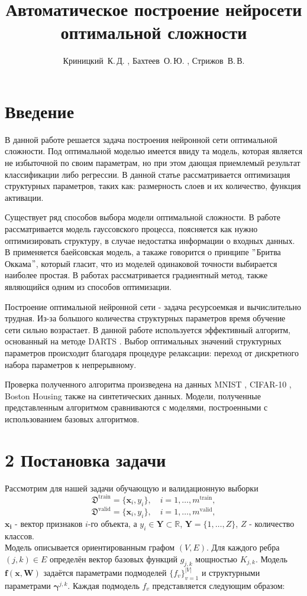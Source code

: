 \documentclass[12pt, twoside]{article}
\title
    {Автоматическое построение нейросети оптимальной сложности }
\author
    {Криницкий~К.\,Д. , Бахтеев~О.\,Ю. , Стрижов~В.\,В.}
\begin{document}
\maketitle

\section{Введение}
  В данной работе решается задача построения нейронной сети оптимальной сложности. Под оптимальной моделью имеется ввиду та модель, которая является не избыточной по своим параметрам, но при этом дающая приемлемый результат классификации либо регрессии. В данной статье рассматривается оптимизация структурных параметров, таких как: размерность слоев и их количество, функция активации.
  \par Существует ряд способов выбора модели оптимальной сложности. В работе \cite{GaussianModel} рассматривается модель гауссовского процесса, поясняется как нужно оптимизировать структуру, в случае недостатка информации о входных данных. В \cite{BayesianModel} применяется баейсовская модель, а такаже говорится о принципе $"$Бритва Оккама$"$, который гласит, что из моделей одинаковой точности выбирается наиболее простая. В работах \cite{Gradient1,Gradient2,Gradient3,Gradient4} рассматривается градиентный метод, также являющийся одним из способов оптимизации. 
  \par Построение оптимальной нейронной сети - задача ресурсоемкая и вычислительно трудная. Из-за большого количества структурных параметров время обучение сети сильно возрастает. В данной работе используется эффективный алгоритм, основанный на методе DARTS \cite{DARTS}. Выбор оптимальных значений структурных параметров происходит благодаря процедуре релаксации: переход от дискретного набора параметров к непрерывному.
  \par Проверка полученного алгоритма произведена на данных MNIST \cite{MNIST}, CIFAR-10 \cite{CIFAR}, Boston Housing \cite{Boston} также на синтетических данных. Модели, полученные представленным алгоритмом сравниваются с моделями, построенными с использованием базовых алгоритмов.



\section{2 Постановка задачи}
Рассмотрим для нашей задачи обучающую и валидационную выборки
$$
\mathfrak{D}^{\text{train}} = \{\mathbf{x}_i, y_i\}, \quad i=1,\dots,m^{\text{train}},
$$
$$
\mathfrak{D}^{\text{valid}} = \{\mathbf{x}_i, y_i\}, \quad i=1,\dots,m^{\text{valid}},
$$
$\mathbf{x_i}$ - вектор признаков $i$-го объекта, а $y_i\in\mathbf{Y}\subset\mathbb{R}$, $\mathbf{Y} = \{1,\dots,Z\}$, $Z$ - количество классов.\\
Модель описывается ориентированным графом $(V, E)$. Для каждого ребра $(j, k) \in E$ определён вектор базовых функций $g_{j, k}$ мощностью $K_{j, k}$. Модель $\textbf{f}(\textbf{x}, \textbf{W})$ задаётся параметрами подмоделей $\{f_{v}\}_{v = 1}^{|V|}$ и структурными параметрами $\boldsymbol{\gamma}^{j,k}$.  
	Каждая подмодель $f_{v}$ представляется следующим образом:
	
\end{document}
